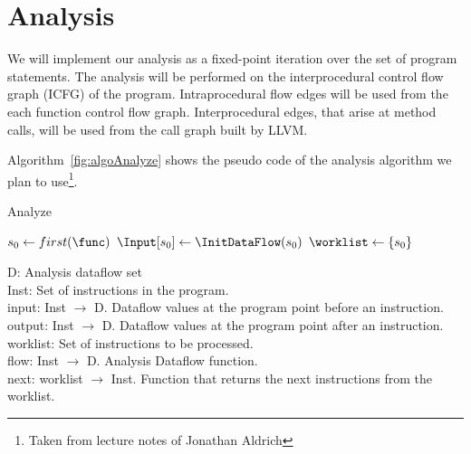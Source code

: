 \section{Analysis}\label{analysis}

We will implement our analysis as a fixed-point iteration
over the set of program statements. The analysis will be
performed on the interprocedural control flow graph (ICFG) of
the program. Intraprocedural flow edges will be used from
the each function control flow graph. Interprocedural edges,
that arise at method calls, will be used from the call graph
built by LLVM.  

Algorithm~\ref{fig:algoAnalyze} shows the pseudo code of the
analysis algorithm we plan to use\footnote{Taken from
lecture notes of Jonathan Aldrich}.

\begin{algorithm}
\caption{Analyze}\label{fig:algoAnalyze}
\SetAlgoLined
\LinesNumbered
\DontPrintSemicolon
{}


$ s_0 \leftarrow first(\func)$\;
$\Input[s_0] \leftarrow \InitDataFlow(s_0)$\;
$\worklist \leftarrow \set{s_0}$\;
\While{ $\worklist\ !=\ \emptyset$ }{
	$\varI \leftarrow \Next(\worklist)$\;
	$\Output[i] = \Flow(\varI, \Input[\varI])$\;
	\ForEach{ $\varJ \in \Succs(\varJ)$ }{
		\If{ $\Output[\varI] \not\sqsubseteq \Input\varJ]$}{
			$\Input[\varJ] = \Input[\varJ] \sqcup \Output[\varI]$\;
			$\worklist = \worklist \cup\ \set{\varJ}$\;
		}	
	}
}
\end{algorithm}
\DecMargin{1em}

D: Analysis dataflow set\\
Inst: Set of instructions in the program.\\
input: Inst $\rightarrow$ D. Dataflow values at the
program point before an instruction.\\
output: Inst $\rightarrow$ D. Dataflow values at the
program point after an instruction.\\
worklist: Set of instructions to be processed.\\
flow: Inst $\rightarrow$ D. Analysis Dataflow function.\\
next: worklist $\rightarrow$ Inst. Function that returns the
next instructions from the worklist.\\

